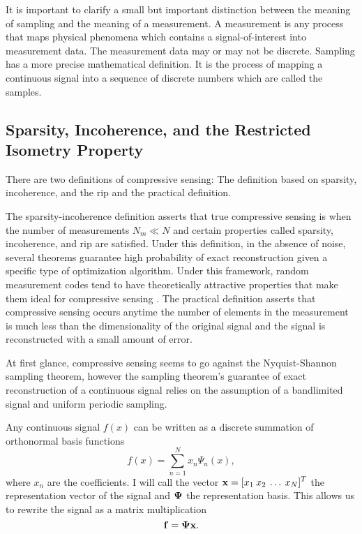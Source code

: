 It is important to clarify a small but important distinction between the meaning of \gls{sampling} and the meaning of a \gls{measurement}. A measurement is any process that maps physical phenomena which contains a signal-of-interest into measurement data. The measurement data may or may not be discrete. Sampling has a more precise mathematical definition. It is the process of mapping a continuous signal into a sequence of discrete numbers which are called the samples. 

\subsection{Sparsity, Incoherence, and the Restricted Isometry Property}

There are two definitions of compressive sensing: The definition based on sparsity, incoherence, and the \gls{rip} and the practical definition.

The sparsity-incoherence definition asserts that true compressive sensing is when the number of measurements $N_m \ll N$ and certain properties called sparsity, incoherence, and \gls{rip} are satisfied. Under this definition, in the absence of noise, several theorems guarantee high probability of exact reconstruction given a specific type of optimization algorithm. Under this framework, random measurement codes tend to have theoretically attractive properties that make them ideal for \gls{compressive sensing} \cite{candes2005l1, candes2006robust, foucart2013mathematical, candes2008introduction}. The practical definition asserts that compressive sensing occurs anytime the number of elements in the measurement is much less than the dimensionality of the original signal and the signal is reconstructed with a small amount of error. 

At first glance, \gls{compressive sensing} seems to go against the Nyquist-Shannon sampling theorem, however the sampling theorem's guarantee of exact reconstruction of a continuous signal relies on the assumption of a bandlimited signal and uniform periodic sampling.

Any continuous signal $f(x)$ can be written as a discrete summation of orthonormal basis functions
\begin{equation}
	f(x) = \sum_{n=1}^{N} x_n \Psi_n(x),
	\label{eq:expansionEquation1}
\end{equation}
where $x_n$ are the coefficients. I will call the vector $\displaystyle \mathbf{x} = [ x_{1} \: x_{2} \: \dots \: x_{N} ]^T$ the representation vector of the signal and $\displaystyle \mathbf{\Psi}$ the representation basis. This allows us to rewrite the signal as a matrix multiplication
\begin{equation}
	\displaystyle \mathbf{f} = \displaystyle \mathbf{\Psi}\displaystyle \mathbf{x}.
\end{equation}

